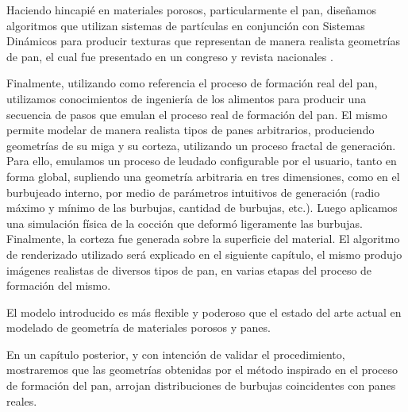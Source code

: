 Haciendo hincapié en materiales porosos, particularmente el pan, diseñamos algoritmos que utilizan sistemas de partículas en conjunción con Sistemas Dinámicos para producir texturas que representan de manera realista geometrías de pan, el cual fue presentado en un congreso y revista nacionales \cite{Baravalle2014}.

Finalmente, utilizando como referencia el proceso de formación real del pan, utilizamos conocimientos de ingeniería de los alimentos para producir una secuencia de pasos que emulan el proceso real de formación del pan.
El mismo permite modelar de manera realista tipos de panes arbitrarios, produciendo geometrías de su miga y su corteza, utilizando un proceso fractal de generación.
Para ello, emulamos un proceso de leudado configurable por el usuario, tanto en forma global, supliendo una geometría arbitraria en tres dimensiones, como en el burbujeado interno, por medio de parámetros intuitivos de generación (radio máximo y mínimo de las burbujas, cantidad de burbujas, etc.).
Luego aplicamos una simulación física de la cocción que deformó ligeramente las burbujas.
Finalmente, la corteza fue generada sobre la superficie del material.
El algoritmo de renderizado utilizado será explicado en el siguiente capítulo, el mismo produjo imágenes realistas de diversos tipos de pan, en varias etapas del proceso de formación del mismo.

El modelo introducido es más flexible y poderoso que el estado del arte actual en modelado de geometría de materiales porosos y panes.

En un capítulo posterior, y con intención de validar el procedimiento, mostraremos que las geometrías obtenidas por el método inspirado en el proceso de formación del pan, arrojan distribuciones de burbujas coincidentes con panes reales.

